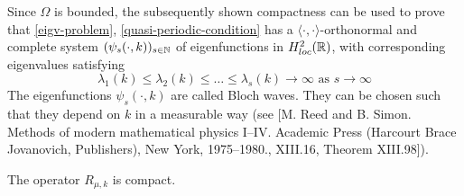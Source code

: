 	Since $\Omega$ is bounded, the subsequently shown compactness can be used to prove that \eqref{eigv-problem}, \eqref{quasi-periodic-condition} has a $\langle \cdot , \cdot \rangle$-orthonormal and complete system $(\psi_{s}(\cdot, k))_{s \in \mathbb{N}}$ of eigenfunctions in $H^{2}_{loc}(\mathbb{R})$, with corresponding eigenvalues satisfying	
	\[ \lambda_{1}(k) \leq \lambda_{2}(k) \leq \dotsc \leq \lambda_{s}(k) \rightarrow \infty \text{ as } s \rightarrow \infty \]
	The eigenfunctions $\psi_{s}(\cdot, k)$ are called Bloch waves. They can be chosen such that they depend on $k$ in a measurable way (see [M. Reed and B. Simon. Methods of modern mathematical physics I–IV. Academic Press (Harcourt Brace Jovanovich, Publishers), New York, 1975–1980., XIII.16, Theorem XIII.98]). \\ %
	\begin{theorem}
		The operator $R_{\mu, k}$ is compact.
	\end{theorem}
